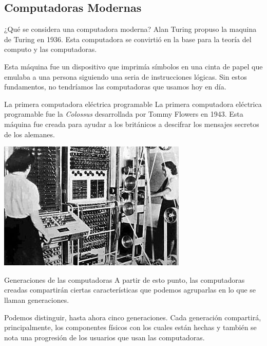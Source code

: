 \documentclass[11pt]{beamer}
\begin{document}
\subsection{Computadoras Modernas}
\begin{frame}{¿Qué se considera una computadora moderna?}
	Alan Turing propuso la maquina de Turing en 1936. Esta computadora se convirtió en la base para la teoría del computo y las computadoras. 
	
	Esta máquina fue un dispositivo que imprimía símbolos en una cinta de papel que emulaba a una persona siguiendo una seria de instrucciones lógicas. Sin estos fundamentos, no tendríamos las computadoras que usamos hoy en día.
\end{frame}
\begin{frame}{La primera computadora eléctrica programable}
	La primera computadora eléctrica programable fue la \textit{Colossus} desarrollada por Tommy Flowers en 1943. Esta máquina fue creada para ayudar a los británicos a descifrar los mensajes secretos de los alemanes.
	
	\centering
	\includegraphics[scale=0.5]{colossus.jpg}
	
\end{frame}
\begin{frame}{Generaciones de las computadoras}
	A partir de esto punto, las computadoras creadas compartirán ciertas características que podemos agruparlas en lo que se llaman generaciones.
	
	Podemos distinguir, hasta ahora cinco generaciones. Cada generación compartirá, principalmente, los componentes físicos con los cuales están hechas y también se nota una progresión de los usuarios que usan las computadoras.
\end{frame}
\end{document}
